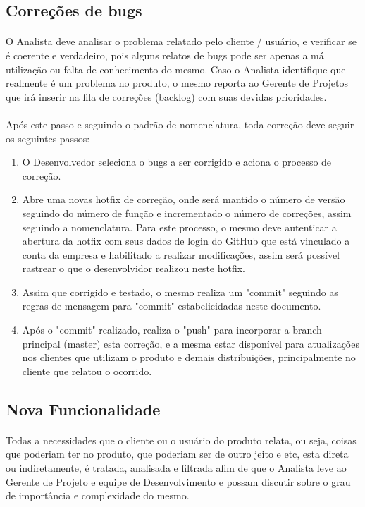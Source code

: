 \documentclass[	DIV=calc,%
							paper=a4,%
							fontsize=12pt,%
							onecolumn]{scrartcl}	 					%
\begin{document}
\subsection{Correções de bugs}
\paragraph{}
O Analista deve analisar o problema relatado pelo cliente / usuário, e verificar se é coerente e verdadeiro, pois alguns relatos de bugs pode ser apenas a má utilização ou falta de conhecimento do mesmo. Caso o Analista identifique que realmente é um problema no produto, o mesmo reporta ao Gerente de Projetos que irá inserir na fila de correções (backlog) com suas devidas prioridades. 
\paragraph{}
Após este passo e seguindo o padrão de nomenclatura, toda correção deve seguir os seguintes passos:
\begin{enumerate}
	\item O Desenvolvedor seleciona o bugs a ser corrigido e aciona o processo de correção.
	\item Abre uma novas hotfix de correção, onde será mantido o número de versão seguindo do número de função e incrementado o número de correções, assim seguindo a nomenclatura. Para este processo, o mesmo deve autenticar a abertura da hotfix com seus dados de login do GitHub que está vinculado a conta da empresa e habilitado a realizar modificações, assim será possível rastrear o que o desenvolvidor realizou neste hotfix.
	\item Assim que corrigido e testado, o mesmo realiza um "commit" seguindo as regras de mensagem para "commit" estabelicidadas neste documento.
	\item Após o "commit" realizado, realiza o "push" para incorporar a branch principal (master) esta correção, e a mesma estar disponível para atualizações nos clientes que utilizam o produto e demais distribuições, principalmente no cliente que relatou o ocorrido.
\end{enumerate}

\subsection{Nova Funcionalidade}
\paragraph{}
Todas a necessidades que o cliente ou o usuário do produto relata, ou seja, coisas que poderiam ter no produto, que poderiam ser de outro jeito e etc, esta direta ou indiretamente, é tratada, analisada e filtrada afim de que o Analista leve ao Gerente de Projeto e equipe de Desenvolvimento e possam discutir sobre o grau de importância e complexidade do mesmo. 
\end{document}
